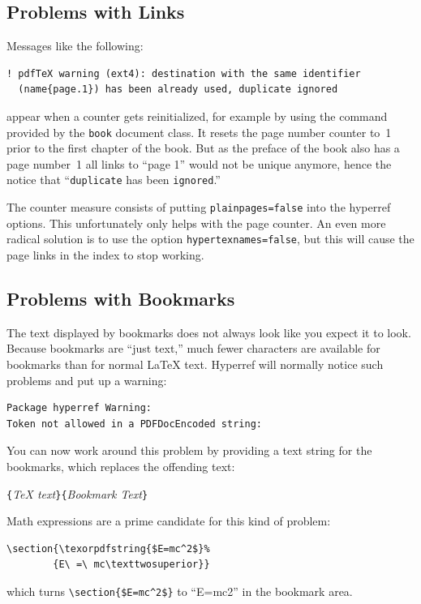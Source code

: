 \subsection{Problems with Links}

Messages like the following:
\begin{verbatim}
! pdfTeX warning (ext4): destination with the same identifier
  (name{page.1}) has been already used, duplicate ignored
\end{verbatim}
appear when a counter gets reinitialized, for example by using
the command  provided by the \texttt{book} document class. It
resets the page number counter to~1 prior to the first chapter of the
book. But as the preface of the book also has a page number~1 all
links to ``page 1'' would not be unique anymore, hence the notice
that ``\verb+duplicate+ has been \verb+ignored+.''

The counter measure consists of putting \texttt{plainpages=false} into
the hyperref options. This unfortunately only helps with the page
counter.
An even more radical solution is to use the option
\texttt{hypertexnames=false}, but this will cause the page links in
the index to stop working.

\subsection{Problems with Bookmarks}

The text displayed by bookmarks does not always look like you expect
it to look. Because bookmarks are ``just text,'' much fewer
characters are available for bookmarks than for normal \LaTeX{} text.
Hyperref will normally notice such problems and put up a warning:
\begin{code}
\begin{verbatim}
Package hyperref Warning: 
Token not allowed in a PDFDocEncoded string:
\end{verbatim}
\end{code}
You can now work around this problem by providing a text string for
the bookmarks, which replaces the offending text:
\begin{lscommand}
\verb|{|\emph{\TeX{} text}\verb|}{|\emph{Bookmark Text}\verb|}|
\end{lscommand}


Math expressions are a prime candidate for this kind of problem:
\begin{code}
\begin{verbatim}
\section{\texorpdfstring{$E=mc^2$}%
        {E\ =\ mc\texttwosuperior}}
\end{verbatim}
\end{code}
which turns \verb+\section{$E=mc^2$}+ to ``E=mc2'' in the bookmark area.

